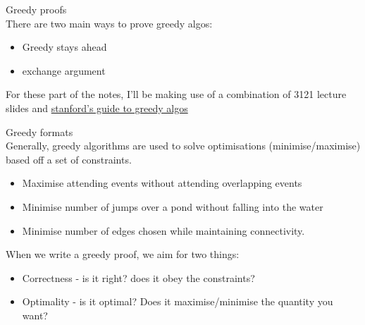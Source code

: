 \documentclass[journal, letterpaper]{IEEEtran}
\begin{document}
\begin{aside}{Greedy proofs}\\
    There are two main ways to prove greedy algos:
    \begin{itemize}
        \item Greedy stays ahead
        \item exchange argument
    \end{itemize}

    For these part of the notes, I'll be making use of a combination of 3121 lecture
    slides and \href{https://web.stanford.edu/class/archive/cs/cs161/cs161.1138/handouts/120\%20Guide\%20to\%20Greedy\%20Algorithms.pdf}{stanford's
    guide to greedy algos}
\end{aside}

\begin{aside}{Greedy formats}\\
    Generally, greedy algorithms are used to solve optimisations (minimise/maximise) based
    off a set of constraints.
    \begin{itemize}
        \item Maximise attending events without attending overlapping events
        \item Minimise number of jumps over a pond without falling into the water
        \item Minimise number of edges chosen while maintaining connectivity.
    \end{itemize}

    When we write a greedy proof, we aim for two things:
    \begin{itemize}
        \item Correctness - is it right? does it obey the constraints?
        \item Optimality - is it optimal? Does it maximise/minimise the quantity you want?
    \end{itemize}
\end{aside}
\end{document}
